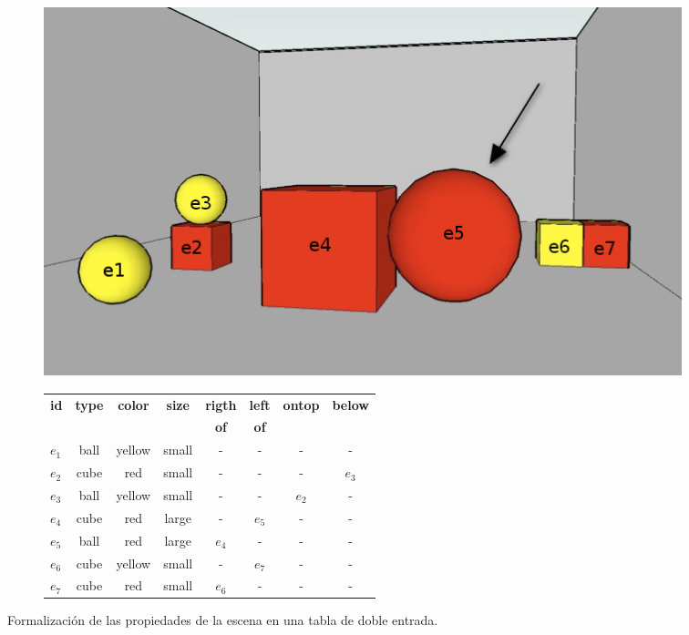 \begin{figure}[h]
\begin{subfigure}{.45\textwidth}
  \centering
	\vspace*{-.2cm}
\includegraphics[width=\textwidth]{images/22.jpg}
  \caption{}\label{GRE3D7-stimulus1-ids}
\end{subfigure}
\begin{subfigure}{1\textwidth}
\hspace*{-16cm}
\begin{scriptsize}
\begin{tabular}{|l|c|c|c|c|c|c|c|}
\hline
\textbf {id}& 	\textbf {type}		&	\textbf {color}	&	\textbf {size}& \textbf {rigth} & \textbf {left} & \textbf {ontop}	& \textbf {below}	\\
   	   &  	    			&	    		&	     		&  \textbf {of}   		 &  \textbf {of}	    &  	&  \\
\hline \hline
$e_1$ & ball & yellow & small & - & - & - & - \\
$e_2$ & cube & red & small & - & - &- & $e_3$ \\
$e_3$ & ball & yellow & small & - & - & $e_2$ & -\\
$e_4$ & cube & red & large & - & $e_5$ & - & -\\
$e_5$ & ball & red & large & $e_4$ & - & - & -\\
$e_6$ & cube & yellow & small & - & $e_7$ & - & -\\
$e_7$ & cube & red & small & $e_6$ & - & - & -\\
\hline

\end{tabular}
\end{scriptsize}
\vspace*{1cm}
\centering \hspace*{-8cm} \caption{}\label{tabla-propiedades}
\end{subfigure}
\caption{Formalizaci\'on de las propiedades de la escena en una tabla de doble entrada.}\label{contexto-tabla-propiedades}
\end{figure}

